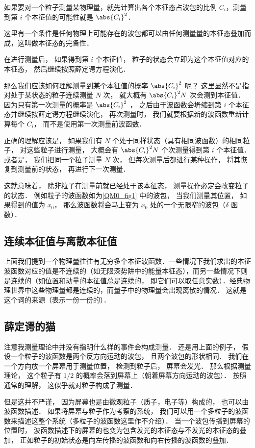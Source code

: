如果要对一个粒子测量某物理量，就先计算出各个本征态占波包的比例 $C_i$，测量到第 $i$ 个本征值的可能性就是 $\abs{C_i}^2$．

这里有一个条件是任何物理上可能存在的波包都可以由任何测量量的本征态叠加而成，这叫做本征态的完备性．

在进行测量后， 如果得到第 $i$ 个本征值， 粒子的状态会立即为这个本征值对应的本征态， 然后继续按照薛定谔方程演化．

那么我们应该如何理解测量到某个本征值的概率 $\abs{C_i}^2$ 呢？ 这里显然不是指对处于某状态的粒子连续测量 $N$ 次， 就大概有 $\abs{C_i}^2 N$ 次会测到本征值． 因为只有第一次测量的概率是 $\abs{C_i}^2$ ， 之后由于波函数会坍缩到第 $i$ 个本征态并继续按薛定谔方程继续演化， 再次测量时， 我们就要根据新的波函数重新计算每个 $C_i$， 而不是使用第一次测量前波函数．

正确的理解应该是， 如果我们有 $N$ 个处于同样状态（具有相同波函数）的相同粒子， 对这些粒子进行测量， 大概会有 $\abs{C_i}^2 N$ 个次测量得到第 $i$ 个本征值． 或者是， 我们把同一个粒子测量 $N$ 次， 但每次测量后都进行某种操作， 将其恢复到测量前的状态， 再进行下一次测量．

这就意味着， 除非粒子在测量前就已经处于该本征态， 测量操作必定会改变粒子的状态． 例如粒子的波函数如为\autoref{QM0_fig1} 中的波包， 当我们测量其位置， 如果得到的值为 $x_0$， 那么波函数将会马上变为 $x_0$ 处的一个无限窄的波包（$\delta$ 函数）．

\subsection{连续本征值与离散本征值}
上面我们提到一个物理量往往有无穷多个本征波函数．一些情况下我们求出的本征波函数对应的值是不连续的（如无限深势阱中的能量本征态），而另一些情况下则是连续的（如位置和动量的本征值总是连续的， 即它们可以取任意实数）．经典物理世界中这些物理量都是连续的，而量子中的物理量会出现离散的情况． 这就是这个词的来源（表示一份一份的）．

\subsection{薛定谔的猫}
注意我测量理论中并没有指明什么样的事件会构成测量． 还是用上面的例子， 假设一个粒子的波函数是两个反方向运动的波包， 且两个波包的形状相同． 我们在一个方向放一个屏幕用于测量位置， 检测到粒子后， 屏幕会发光． 那么根据测量理论， 这个粒子有 $1/2$ 的概率会落到屏幕上（朝着屏幕方向运动的波包）． 按照通常的理解， 这似乎就对粒子构成了测量．

但是这并不严谨， 因为屏幕也是由微观粒子（质子，电子等）构成的， 也可以由波函数描述． 如果将屏幕与粒子作为考察的系统， 我们可以用一个多粒子的波函数来描述这整个系统（多粒子的波函数这里作不介绍）． 当一个波包传播到屏幕的位置时， 波函数描述下的屏幕的也变为包含发光的本征态与不发光的本征态的叠加， 正如粒子的初始状态是向左传播的波函数和向右传播的波函数的叠加． 

